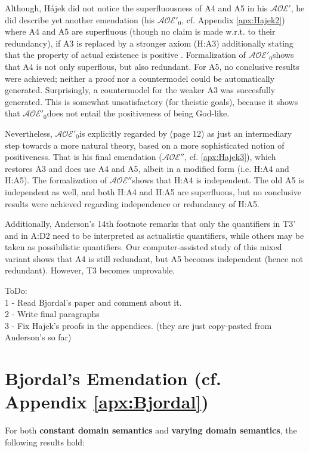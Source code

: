 \documentclass{birkjour}
\newcommand{\AOEH}{$\mathcal{AOE}'$}
\newcommand{\AOEHH}{$\mathcal{AOE}'_0$}
\newcommand{\AOEHHH}{$\mathcal{AOE}''$}
\theoremstyle{definition}
\theoremstyle{remark}
\numberwithin{equation}{section}
\begin{document}
Although, Hájek did not notice the superfluousness of A4 and A5 in his \AOEH, he did describe yet another emendation (his \AOEHH, cf. Appendix \ref{apx:Hajek2}) where A4 and A5 are superfluous (though no claim is made w.r.t. to their redundancy), if A3 is replaced by a stronger axiom (H:A3) additionally stating that the property of actual existence is positive \cite[sec.~5]{Hajek2002}. Formalization of \AOEHH shows that A4 is not only superflous, but also redundant. For A5, no conclusive results were achieved; neither a proof nor a countermodel could be automatically generated. Surprisingly, a countermodel for the weaker A3 was succesfully generated. This is somewhat unsatisfactory (for theistic goals), because it shows that \AOEHH does not entail the positiveness of being God-like.

Nevertheless, \AOEHH is explicitly regarded by \citet[p.~12]{Hajek2002} (page 12) as just an intermediary step towards a more natural theory, based on a more sophisticated notion of positiveness. That is his final emendation (\AOEHHH, cf. \ref{apx:Hajek3}), which restores A3 and does use A4 and A5, albeit in a modified form (i.e. H:A4 and H:A5). The formalization of \AOEHHH shows that H:A4 is independent. The old A5 is independent as well, and both H:A4 and H:A5 are superfluous, but no conclusive results were achieved regarding independence or redundancy of H:A5.

Additionally, Anderson's 14th footnote \citep[footnote 14]{anderson90:_some_emend_of_goedel_ontol_proof} remarks that only the quantifiers in T3' and in A:D2 need to be interpreted as actualistic quantifiers, while others may be taken as possibilistic quantifiers. Our computer-assisted study of this mixed variant shows that A4 is still redundant, but A5 becomes independent (hence not redundant). However, T3 becomes unprovable.


ToDo: \\
1 - Read Bjordal's paper and comment about it. \\
2 - Write final paragraphs \\
3 - Fix Hajek's proofs in the appendices. (they are just copy-pasted from Anderson's so far)

 
\section{Bjordal's Emendation (cf. Appendix \ref{apx:Bjordal})}

For both \textbf{constant domain semantics} and \textbf{varying domain semantics}, the following results hold:
\end{document}
